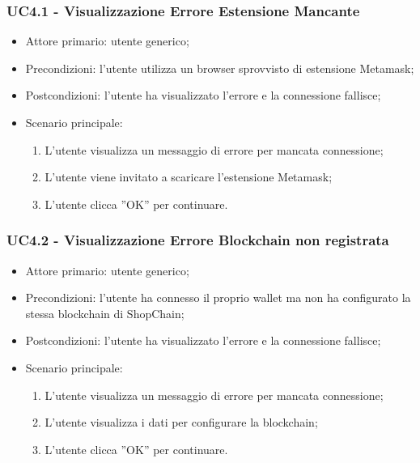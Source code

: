 \subsubsection{UC4.1 - Visualizzazione Errore Estensione Mancante}

\begin{itemize}
    \item Attore primario: utente generico;
    \item Precondizioni: l'utente utilizza un browser sprovvisto di estensione Metamask\glo{};
    \item Postcondizioni: l'utente ha visualizzato l'errore e la connessione fallisce;
    \item Scenario principale:
        \begin{enumerate}
            \item L'utente visualizza un messaggio di errore per mancata connessione;
            \item L'utente viene invitato a scaricare l'estensione Metamask\glo{};
            \item L'utente clicca ”OK” per continuare.
        \end{enumerate}
\end{itemize}

\subsubsection{UC4.2 - Visualizzazione Errore Blockchain non registrata}

\begin{itemize}
    \item Attore primario: utente generico;
    \item Precondizioni: l'utente ha connesso il proprio wallet\glo{} ma non ha configurato la stessa blockchain\glo{} di ShopChain;
    \item Postcondizioni: l'utente ha visualizzato l'errore e la connessione fallisce;
    \item Scenario principale:
          \begin{enumerate}
              \item L'utente visualizza un messaggio di errore per mancata connessione;
              \item L'utente visualizza i dati per configurare la blockchain\glo{};
              \item L'utente clicca ”OK” per continuare.
          \end{enumerate}
\end{itemize}


